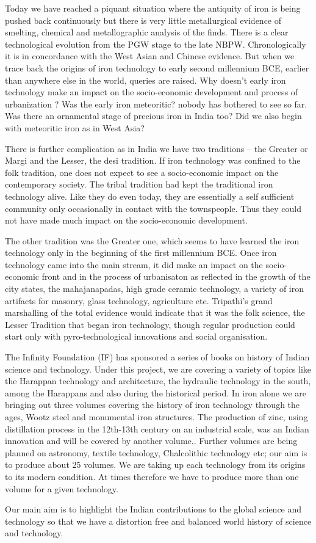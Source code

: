 Today we have reached a piquant situation where the antiquity of iron is being pushed back continuously but there is very little metallurgical evidence of smelting, chemical and metallographic analysis of the finds. There is a clear technological evolution from the PGW stage to the late NBPW. Chronologically it is in concordance with the West Asian and Chinese evidence. But when we trace back the origins of iron technology to early second millennium BCE, earlier than anywhere else in the world, queries are raised. Why doesn’t early iron technology make an impact on the socio-economic development and process of urbanization ? Was the early iron meteoritic? nobody has bothered to see so far. Was there an ornamental stage of precious iron in India too? Did we also begin with meteoritic iron as in West Asia? 

There is further complication as in India we have two traditions – the Greater or Margi and the Lesser, the desi tradition. If iron technology was confined to the folk tradition, one does not expect to see a socio-economic impact on the contemporary society. The tribal tradition had kept the traditional iron technology alive. Like they do even today, they are essentially a self sufficient community only occasionally in contact with the townspeople.  Thus they could not have made much impact on the socio-economic development.

The other tradition was the Greater one, which seems to have learned the iron technology only in the beginning of the first millennium BCE. Once iron technology came into the main stream, it did make an impact on the socio-economic front and in the process of urbanisaton as reflected in the growth of the city states, the mahajanapadas, high grade ceramic technology, a variety of iron artifacts for masonry, glass technology, agriculture etc. Tripathi’s grand marshalling of the total evidence would indicate that it was the folk science, the Lesser Tradition that began iron technology, though regular production could start only with pyro-technological innovations and social organisation.

The Infinity Foundation (IF) has sponsored a series of books on history of Indian science and technology. Under this project, we are covering a variety of topics like the Harappan technology and architecture, the hydraulic technology in the south, among the Harappans and also during the historical period. In iron alone we are bringing out three  volumes covering the history of iron technology through the ages, Wootz steel and monumental iron structures. The production of zinc, using distillation process in the 12th-13th century on an industrial scale, was an Indian innovation and will  be covered by another volume.. Further volumes are being planned on astronomy, textile technology, Chalcolithic technology etc; our aim is to produce about 25 volumes. We are taking up each technology from its origins to its modern condition.  At times therefore we have to produce more than one volume for a given technology.

Our main aim is to highlight the Indian contributions to the global science and  technology so that we have a distortion free  and balanced world history of science and technology.



\label{endpreface5}

